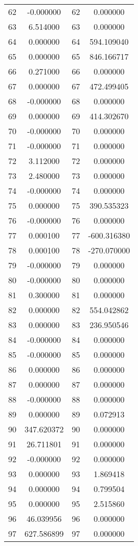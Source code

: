\documentclass[12pt]{article}
\begin{document}
\begin{longtable}{@{}cccc@{}}
62 & -0.000000 & 62 & 0.000000 \\
63 & 6.514000 & 63 & 0.000000 \\
64 & 0.000000 & 64 & 594.109040 \\
65 & 0.000000 & 65 & 846.166717 \\
66 & 0.271000 & 66 & 0.000000 \\
67 & 0.000000 & 67 & 472.499405 \\
68 & -0.000000 & 68 & 0.000000 \\
69 & 0.000000 & 69 & 414.302670 \\
70 & -0.000000 & 70 & 0.000000 \\
71 & -0.000000 & 71 & 0.000000 \\
72 & 3.112000 & 72 & 0.000000 \\
73 & 2.480000 & 73 & 0.000000 \\
74 & -0.000000 & 74 & 0.000000 \\
75 & 0.000000 & 75 & 390.535323 \\
76 & -0.000000 & 76 & 0.000000 \\
77 & 0.000100 & 77 & -600.316380 \\
78 & 0.000100 & 78 & -270.070000 \\
79 & -0.000000 & 79 & 0.000000 \\
80 & -0.000000 & 80 & 0.000000 \\
81 & 0.300000 & 81 & 0.000000 \\
82 & 0.000000 & 82 & 554.042862 \\
83 & 0.000000 & 83 & 236.950546 \\
84 & -0.000000 & 84 & 0.000000 \\
85 & -0.000000 & 85 & 0.000000 \\
86 & 0.000000 & 86 & 0.000000 \\
87 & 0.000000 & 87 & 0.000000 \\
88 & -0.000000 & 88 & 0.000000 \\
89 & 0.000000 & 89 & 0.072913 \\
90 & 347.620372 & 90 & 0.000000 \\
91 & 26.711801 & 91 & 0.000000 \\
92 & -0.000000 & 92 & 0.000000 \\
93 & 0.000000 & 93 & 1.869418 \\
94 & 0.000000 & 94 & 0.799504 \\
95 & 0.000000 & 95 & 2.515860 \\
96 & 46.039956 & 96 & 0.000000 \\
97 & 627.586899 & 97 & 0.000000 \\

\end{longtable}
\end{document}
